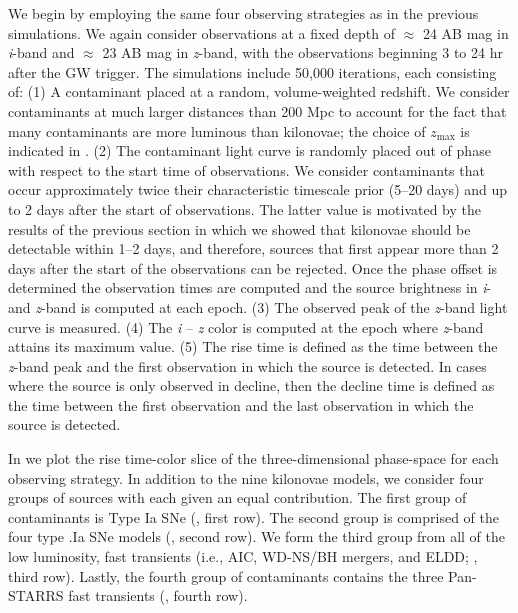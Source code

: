 We begin by employing the same four observing strategies as in the previous simulations. We again consider observations at a fixed depth of $\approx$ 24 AB mag in {\em i}-band and $\approx$ 23 AB mag in {\em z}-band, with the observations beginning 3 to 24 hr after the GW trigger. The simulations include 50,000 iterations, each consisting of: (1) A contaminant placed at a random, volume-weighted redshift. We consider contaminants at much larger distances than 200 Mpc to account for the fact that many contaminants are more luminous than kilonovae; the choice of $z_{\text{max}}$ is indicated in . (2) The contaminant light curve is randomly placed out of phase with respect to the start time of observations. We consider contaminants that occur approximately twice their characteristic timescale prior (5--20 days) and up to 2 days after the start of observations. The latter value is motivated by the results of the previous section in which we showed that kilonovae should be detectable within 1--2 days, and therefore, sources that first appear more than 2 days after the start of the observations can be rejected. Once the phase offset is determined the observation times are computed and the source brightness in {\em i}- and {\em z}-band is computed at each epoch. (3) The observed peak of the {\em z}-band light curve is measured. (4) The {\em i} -- {\em z} color is computed at the epoch where {\em z}-band attains its maximum value. (5) The rise time is defined as the time between the {\em z}-band peak and the first observation in which the source is detected. In cases where the source is only observed in decline, then the decline time is defined as the time between the first observation and the last observation in which the source is detected.

In  we plot the rise time-color slice of the three-dimensional phase-space for each observing strategy. In addition to the nine kilonovae models, we consider four groups of sources with each given an equal contribution. The first group of contaminants is Type Ia SNe (, first row). The second group is comprised of the four type .Ia SNe models (, second row). We form the third group from all of the low luminosity, fast transients (i.e., AIC, WD-NS/BH mergers, and ELDD; , third row). Lastly, the fourth group of contaminants contains the three Pan-STARRS fast transients (, fourth row).

